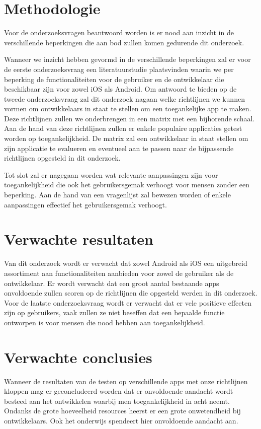 \section{Methodologie}
\label{sec:methodologie}

Voor de onderzoeksvragen beantwoord worden is er nood aan inzicht in de verschillende beperkingen die aan bod zullen komen gedurende dit onderzoek. 

Wanneer we inzicht hebben gevormd in de verschillende beperkingen zal er voor de eerste onderzoeksvraag een literatuurstudie plaatsvinden waarin we per beperking de functionaliteiten voor de gebruiker en de ontwikkelaar die beschikbaar zijn voor zowel iOS als Android. Om antwoord te bieden op de tweede onderzoeksvraag zal dit onderzoek nagaan welke richtlijnen we kunnen vormen om ontwikkelaars in staat te stellen om een toegankelijke app te maken. Deze richtlijnen zullen we onderbrengen in een matrix met een bijhorende schaal. 
Aan de hand van deze richtlijnen zullen er enkele populaire applicaties getest worden op toegankelijkheid. De matrix zal een ontwikkelaar in staat stellen om zijn applicatie te evalueren en eventueel aan te passen naar de bijpassende richtlijnen opgesteld in dit onderzoek. 

Tot slot zal er nagegaan worden wat relevante aanpassingen zijn voor toegankelijkheid die ook het gebruikersgemak verhoogt voor mensen zonder een beperking. Aan de hand van een vragenlijst zal bewezen worden of enkele aanpassingen effectief het gebruikersgemak verhoogt.


\section{Verwachte resultaten}
\label{sec:verwachte_resultaten}

Van dit onderzoek wordt er verwacht dat zowel Android als iOS een uitgebreid assortiment aan functionaliteiten aanbieden voor zowel de gebruiker als de ontwikkelaar. Er wordt verwacht dat een groot aantal bestaande apps onvoldoende zullen scoren op de richtlijnen die opgesteld werden in dit onderzoek. Voor de laatste onderzoeksvraag wordt er verwacht dat er vele positieve effecten zijn op gebruikers, vaak zullen ze niet beseffen dat een bepaalde functie ontworpen is voor mensen die nood hebben aan toegankelijkheid.

\section{Verwachte conclusies}
\label{sec:verwachte_conclusies}

Wanneer de resultaten van de testen op verschillende apps met onze richtlijnen kloppen mag er geconcludeerd worden dat er onvoldoende aandacht wordt besteed aan het ontwikkelen waarbij men toegankelijkheid in acht neemt. Ondanks de grote hoeveelheid resources heerst er een grote onwetendheid bij ontwikkelaars. Ook het onderwijs spendeert hier onvoldoende aandacht aan.
